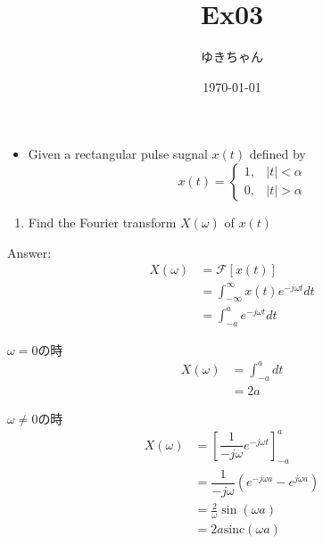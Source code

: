 \documentclass[a4paper,16pt]{jsarticle}
\title{Ex03}
\author{ゆきちゃん}
\date{\today}
\begin{document}
\maketitle

\begin{itemize}
	\item Given a rectangular pulse sugnal $x(t)$ defined by
	\begin{equation}
		x(t) =
		\begin{cases}
			1, & |t| < \alpha \\
			0, & |t| > \alpha
		\end{cases}
	\end{equation}
\end{itemize}

\begin{enumerate}
	\item Find the Fourier transform $X(\omega)$ of $x(t)$
\end{enumerate}

Answer:
\begin{align}
	X(\omega) &= \mathcal{F}[x(t)] \\
	&= \int_{-\infty}^\infty x(t) e^{-j\omega t}dt \\
	&= \int_{-a}^a e^{-j\omega t}dt
\end{align}

$\omega = 0$の時
\begin{align}
	X(\omega) &= \int_{-a}^a dt \\
	&= 2a
\end{align}

$\omega \neq 0$の時
\begin{align}
	X(\omega) &= \left[\dfrac{1}{-j\omega} e^{-j\omega t}\right]_{-a}^a\\
	&= \dfrac{1}{-j\omega}\left(e^{-j\omega a} - e^{j\omega a}\right) \\
	&= \frac{2}{\omega} \sin(\omega a) \\
	&= 2a \mathrm{sinc}(\omega a)
\end{align}
\end{document}
